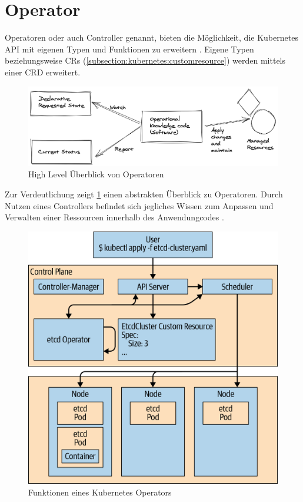\section{Operator}
\label{sec:komponenten:operator}

Operatoren oder auch Controller genannt, bieten die Möglichkeit, die Kubernetes API mit eigenen Typen und Funktionen zu erweitern .
Eigene Typen beziehungsweise \acp{CR} (\ref{subsection:kubernetes:customresource}) werden mittels einer \ac{CRD} erweitert.

\begin{figure}[h]
  \centering
  \includegraphics[width=\textwidth]{gfx/chapters/3_komponenten/operator_highlevel.png}
  \caption{High Level Überblick von Operatoren}
  \label{fig:kubernetes_operator_highlevel}
\end{figure}

Zur Verdeutlichung zeigt \ref{fig:kubernetes_operator_highlevel} einen abstrakten Überblick zu Operatoren.  
Durch Nutzen eines Controllers befindet sich jegliches Wissen zum Anpassen und Verwalten einer Ressourcen innerhalb des Anwendungcodes \cite{operatorWhitepaper}.

\begin{figure}[h]
  \centering
  \includegraphics[width=\textwidth]{gfx/chapters/3_komponenten/operator_example.png}
  \caption{Funktionen eines Kubernetes Operators}
  \label{fig:kubernetes_operator_example}
\end{figure}

